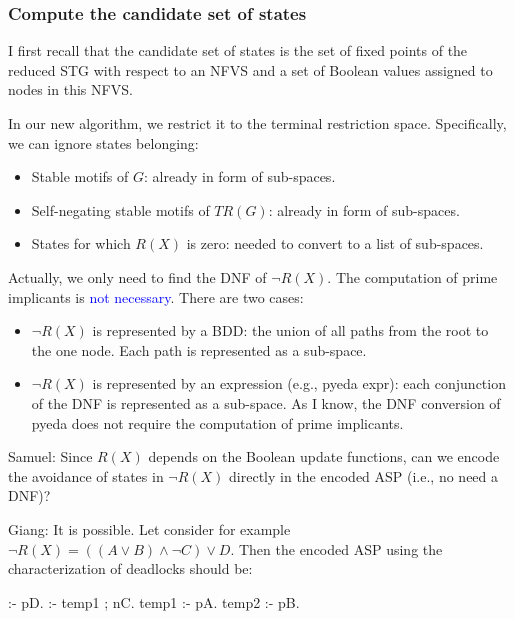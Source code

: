 \documentclass{beamer}              %
\newcommand{\blue}[1]{\textcolor{blue}{#1}}
\begin{document}
\begin{frame}
\frametitle{Compute the candidate set of states}

I first recall that the candidate set of states is the set of fixed points of the reduced STG with respect to an NFVS and a set of Boolean values assigned to nodes in this NFVS.

\hspace{0cm}

In our new algorithm, we restrict it to the terminal restriction space.
Specifically, we can ignore states belonging:
\begin{itemize}
  \item Stable motifs of \(G\): already in form of sub-spaces.
  \item Self-negating stable motifs of \(TR(G)\): already in form of sub-spaces.
  \item States for which \(R(X)\) is zero: needed to convert to a list of sub-spaces.
\end{itemize}

\hspace{0cm}

Actually, we only need to find the DNF of \(\neg R(X)\).
The computation of prime implicants is \blue{not necessary}.
There are two cases:
\begin{itemize}
  \item \(\neg R(X)\) is represented by a BDD: the union of all paths from the root to the one node. Each path is represented as a sub-space.
  \item \(\neg R(X)\) is represented by an expression (e.g., pyeda expr): each conjunction of the DNF is represented as a sub-space. As I know, the DNF conversion of pyeda does not require the computation of prime implicants.
\end{itemize}

\hspace{0cm}

Samuel: Since \(R(X)\) depends on the Boolean update functions, can we encode the avoidance of states in \(\neg R(X)\) directly in the encoded ASP (i.e., no need a DNF)?

\hspace{0cm}

Giang: It is possible. Let consider for example \(\neg R(X) = ((A \lor B) \land \neg C) \lor D\). Then the encoded ASP using the characterization of deadlocks should be:

\begin{verbatim*}
:- pD.
:- temp1 ; nC.
temp1 :- pA.
temp2 :- pB.
\end{verbatim*}


\end{frame}
\end{document}
